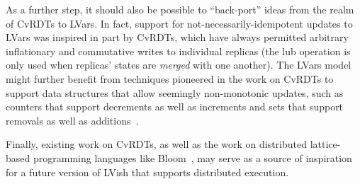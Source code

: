 As a further step, it should also be possible to ``back-port'' ideas
from the realm of CvRDTs to LVars.  In fact, support for
not-necessarily-idempotent updates to LVars was inspired in part by
CvRDTs, which have always permitted arbitrary inflationary and
commutative writes to individual replicas (the lub operation is only
used when replicas' states are \emph{merged} with one another).  The
LVars model might further benefit from techniques pioneered in the
work on CvRDTs to support data structures that allow seemingly
non-monotonic updates, such as counters that support decrements as
well as increments and sets that support removals as well as
additions~\cite{crdts}.

Finally, existing work on CvRDTs, as well as the work on distributed
lattice-based programming languages like Bloom~\cite{bloom-cidr,
  blooml}, may serve as a source of inspiration for a future version
of LVish that supports distributed execution.
\fi
